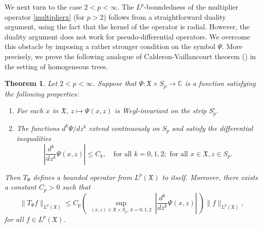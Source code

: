 \documentclass[12pt,reqno]{amsart}
\newtheorem{theorem}{Theorem}[section]
\theoremstyle{definition}
\theoremstyle{definition}
\numberwithin{equation}{section}
\begin{document}
We next turn to the case $2<p<\infty$. The $L^{p}$-boundedness of the multiplier operator \eqref{multiplierx} (for $p>2$) follows from a straightforward duality argument, using the fact that the kernel of the operator is radial. However, the duality argument does not work for pseudo-differential operators. We overcome this obstacle by imposing a rather stronger condition on the symbol $\Psi$. More precisely, we prove the following analogue of  Calderon-Vaillancourt theorem (\cite[Theorem 2.8]{MR2104184}) in the setting of homogeneous trees.
\begin{theorem}\label{mainresult2}
Let $2<p<\infty$. Suppose that $ \Psi:\mathfrak{X}\times S_{p}\rightarrow\mathbb{C}$ is a function satisfying the following properties:
	\begin{enumerate}
		\item For each $x$ in $\mathfrak{X}$, $z\mapsto\Psi(x,z)$ is Weyl-invariant on the strip $S^{\circ}_{p}$.
		\item The functions $d^{k}\Psi/dz^{k}$  extend continuously on $S_{p}$ and satisfy the differential inequalities
\begin{equation}\label{eqn_regular_condn_Psi_thm2}
			\left|\frac{d^{k}}{dz^{k}}\Psi(x,z)\right|\leq C_{k},\quad\text{for all }k=0,1,2;\text{ for all }x\in\mathfrak{X},z\in S_{p}.
\end{equation}
	\end{enumerate}
	Then $T_{\Psi}$ defines a bounded operator from $L^{p}(\mathfrak{X})$ to itself. Moreover, there exists a constant $C_{p}>0$ such that
$$\|T_{\Psi}f\|_{L^{p}(\mathfrak{X})}\leq C_{p}\left(~\sup\limits_{(x,z)\in\mathfrak{X}\times S_{p},~k=0,1,2}~\left|\frac{d^{k}}{dz^{k}}\Psi(x,z)\right|~\right) \|f\|_{L^{p}(\mathfrak{X})},$$
for all $f\in L^{p}(\mathfrak{X})$.
\end{theorem}
\end{document}

